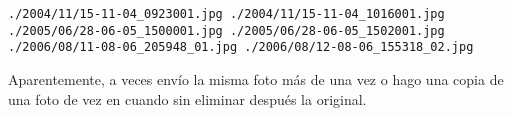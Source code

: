 \begin{ex}
\begin{enumerate}
\beforeverb
\begin{verbatim}
./2004/11/15-11-04_0923001.jpg ./2004/11/15-11-04_1016001.jpg
./2005/06/28-06-05_1500001.jpg ./2005/06/28-06-05_1502001.jpg
./2006/08/11-08-06_205948_01.jpg ./2006/08/12-08-06_155318_02.jpg
\end{verbatim}
\afterverb
%
Aparentemente, a veces envío la misma foto más de una vez
o hago una copia de una foto de vez en cuando sin eliminar después
la original.

\end{enumerate}

\end{ex}